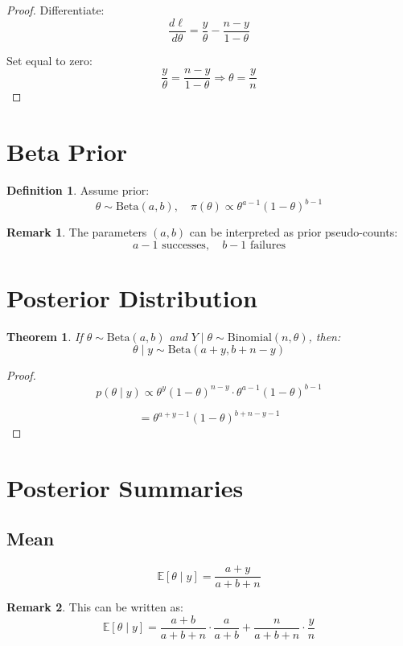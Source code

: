 \documentclass[12pt,oneside]{book}
\numberwithin{equation}{section}
\theoremstyle{definition}
\newtheorem{definition}{Definition}[section]
\newtheorem{remark}{Remark}[section]
\theoremstyle{plain}
\newtheorem{theorem}{Theorem}[section]
\theoremstyle{remark}
\newcommand{\E}{\mathbb{E}}
\newcommand{\Bin}{\mathrm{Binomial}}
\newcommand{\BetaDist}{\mathrm{Beta}}
\begin{document}
\begin{proof}
Differentiate:
$$
\frac{d\ell}{d\theta} = \frac{y}{\theta} - \frac{n-y}{1-\theta}
$$

Set equal to zero:
$$
\frac{y}{\theta} = \frac{n-y}{1-\theta}
\Rightarrow \theta = \frac{y}{n}
$$
\end{proof}

\section{Beta Prior}

\begin{definition}
Assume prior:
$$
\theta \sim \BetaDist(a,b), \quad \pi(\theta) \propto \theta^{a-1}(1-\theta)^{b-1}
$$
\end{definition}

\begin{remark}
The parameters $(a,b)$ can be interpreted as prior pseudo-counts:
$$
a-1 \text{ successes}, \quad b-1 \text{ failures}
$$
\end{remark}

\section{Posterior Distribution}

\begin{theorem}
If $\theta \sim \BetaDist(a,b)$ and $Y \mid \theta \sim \Bin(n,\theta)$, then:
$$
\theta \mid y \sim \BetaDist(a+y, b+n-y)
$$
\end{theorem}

\begin{proof}
$$
p(\theta \mid y) \propto \theta^y(1-\theta)^{n-y} \cdot \theta^{a-1}(1-\theta)^{b-1}
$$

$$
= \theta^{a+y-1}(1-\theta)^{b+n-y-1}
$$
\end{proof}

\section{Posterior Summaries}

\subsection{Mean}

$$
\E[\theta \mid y] = \frac{a+y}{a+b+n}
$$

\begin{remark}
This can be written as:
$$
\E[\theta \mid y]
=
\frac{a+b}{a+b+n}\cdot \frac{a}{a+b}
+
\frac{n}{a+b+n}\cdot \frac{y}{n}
$$
\end{remark}
\end{document}
